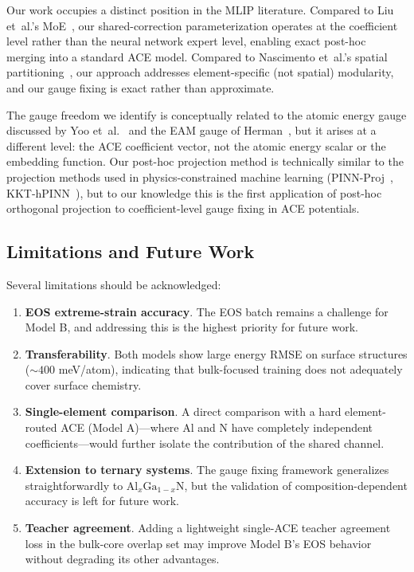 \documentclass[twoside,prb,aps,floatfix,superscriptaddress,longbibliography]{revtex4-2}
\begin{document}
Our work occupies a distinct position in the MLIP literature. Compared to Liu et~al.'s MoE~\cite{Liu2026ScalingMoE}, our shared-correction parameterization operates at the coefficient level rather than the neural network expert level, enabling exact post-hoc merging into a standard ACE model. Compared to Nascimento et~al.'s spatial partitioning~\cite{Nascimento2026MoEFramework}, our approach addresses element-specific (not spatial) modularity, and our gauge fixing is exact rather than approximate.

The gauge freedom we identify is conceptually related to the atomic energy gauge discussed by Yoo et~al.~\cite{Yoo2019AtomicEnergyMapping} and the EAM gauge of Herman~\cite{Herman2008EAMGauge}, but it arises at a different level: the ACE coefficient vector, not the atomic energy scalar or the embedding function. Our post-hoc projection method is technically similar to the projection methods used in physics-constrained machine learning (PINN-Proj~\cite{PINNProj2024}, KKT-hPINN~\cite{KKThPINN2024}), but to our knowledge this is the first application of post-hoc orthogonal projection to coefficient-level gauge fixing in ACE potentials.

\subsection{Limitations and Future Work}

Several limitations should be acknowledged:
\begin{enumerate}
    \item \textbf{EOS extreme-strain accuracy}. The EOS batch remains a challenge for Model B, and addressing this is the highest priority for future work.
    \item \textbf{Transferability}. Both models show large energy RMSE on surface structures ($\sim 400$ meV/atom), indicating that bulk-focused training does not adequately cover surface chemistry.
    \item \textbf{Single-element comparison}. A direct comparison with a hard element-routed ACE (Model A)---where $\mathrm{Al}$ and $\mathrm{N}$ have completely independent coefficients---would further isolate the contribution of the shared channel.
    \item \textbf{Extension to ternary systems}. The gauge fixing framework generalizes straightforwardly to $\mathrm{Al}_x\mathrm{Ga}_{1-x}\mathrm{N}$, but the validation of composition-dependent accuracy is left for future work.
    \item \textbf{Teacher agreement}. Adding a lightweight single-ACE teacher agreement loss in the bulk-core overlap set may improve Model B's EOS behavior without degrading its other advantages.
\end{enumerate}
\end{document}
